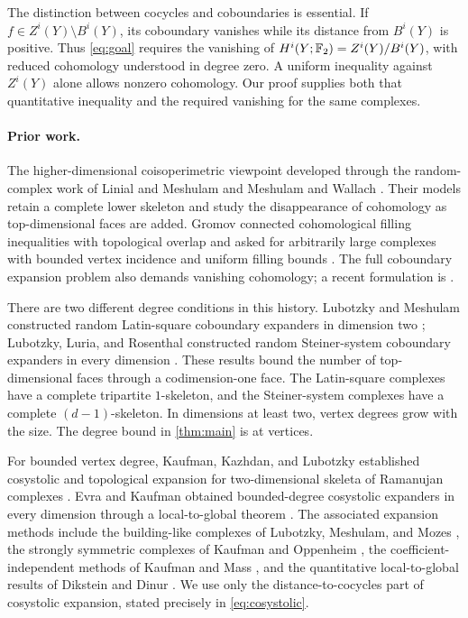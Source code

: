 The distinction between cocycles and coboundaries is essential. If
$f\in Z^i(Y)\setminus B^i(Y)$, its coboundary vanishes while its distance
from $B^i(Y)$ is positive. Thus \eqref{eq:goal} requires the vanishing of
$H^i(Y;\mathbb F_2)=Z^i(Y)/B^i(Y)$, with reduced cohomology understood in degree
zero. A uniform inequality against $Z^i(Y)$ alone allows nonzero
cohomology. Our proof supplies both that quantitative inequality and
the required vanishing for the same complexes.

\paragraph{Prior work.}
The higher-dimensional coisoperimetric viewpoint developed through the
random-complex work of Linial and Meshulam \cite{LM2006} and Meshulam and
Wallach \cite{MW2009}. Their models retain a complete lower skeleton and
study the disappearance of cohomology as top-dimensional faces are
added. Gromov connected cohomological filling inequalities with
topological overlap and asked for arbitrarily large complexes with
bounded vertex incidence and uniform filling bounds
\cite[Sections~2.3--2.5 and~2.14]{Gromov2010}. The full coboundary
expansion problem also demands vanishing cohomology; a recent formulation
is \cite[Problem~1.3]{CL2025}.

There are two different degree conditions in this history. Lubotzky and
Meshulam constructed random Latin-square coboundary expanders in
dimension two \cite{LM2015}; Lubotzky, Luria, and Rosenthal constructed
random Steiner-system coboundary expanders in every dimension
\cite{LLR2019}. These results bound the number of top-dimensional faces
through a codimension-one face. The Latin-square complexes have a
complete tripartite $1$-skeleton, and the Steiner-system complexes have
a complete $(d-1)$-skeleton. In dimensions at least two, vertex degrees
grow with the size. The degree bound in \cref{thm:main} is at vertices.

For bounded vertex degree, Kaufman, Kazhdan, and Lubotzky established
cosystolic and topological expansion for two-dimensional skeleta of
Ramanujan complexes \cite{KKL2016}. Evra and Kaufman obtained
bounded-degree cosystolic expanders in every dimension through a
local-to-global theorem \cite{EK2024}. The associated expansion methods
include the building-like complexes of Lubotzky, Meshulam, and Mozes
\cite{LMM2016}, the strongly symmetric complexes of Kaufman and Oppenheim
\cite{KO2021}, the coefficient-independent methods of Kaufman and Mass
\cite{KM2021}, and the quantitative local-to-global results of Dikstein
and Dinur \cite{DD2024}. We use only the distance-to-cocycles part of
cosystolic expansion, stated precisely in \eqref{eq:cosystolic}.

